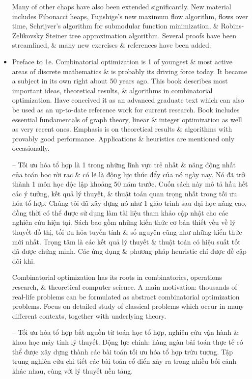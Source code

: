\documentclass{article}
\begin{document}
\begin{itemize}
    Many of other chaps have also been extended significantly. New material includes Fibonacci heaps, Fujishige's new maximum flow algorithm, flows over time, Schrijver's algorithm for submodular function minimization, \& Robins-Zelikovsky Steiner tree approximation algorithm. Several proofs have been streamlined, \& many new exercises \& references have been added.
    \item {\sf Preface to 1e.} Combinatorial optimization is 1 of youngest \& most active areas of discrete mathematics \& is probably its driving force today. It became a subject in its own right about 50 years ago. This book describes most important ideas, theoretical results, \& algorithms in combinatorial optimization. Have conceived it as an advanced graduate text which can also be used as an up-to-date reference work for current research. Book includes essential fundamentals of graph theory, linear \& integer optimization as well as very recent ones. Emphasis is on theoretical results \& algorithms with provably good performance. Applications \& heuristics are mentioned only occasionally.

    -- Tối ưu hóa tổ hợp là 1 trong những lĩnh vực trẻ nhất \& năng động nhất của toán học rời rạc \& có lẽ là động lực thúc đẩy của nó ngày nay. Nó đã trở thành 1 môn học độc lập khoảng 50 năm trước. Cuốn sách này mô tả hầu hết các ý tưởng, kết quả lý thuyết, \& thuật toán quan trọng nhất trong tối ưu hóa tổ hợp. Chúng tôi đã xây dựng nó như 1 giáo trình sau đại học nâng cao, đồng thời có thể được sử dụng làm tài liệu tham khảo cập nhật cho các nghiên cứu hiện tại. Sách bao gồm những kiến thức cơ bản thiết yếu về lý thuyết đồ thị, tối ưu hóa tuyến tính \& số nguyên cũng như những kiến thức mới nhất. Trọng tâm là các kết quả lý thuyết \& thuật toán có hiệu suất tốt đã được chứng minh. Các ứng dụng \& phương pháp heuristic chỉ được đề cập đôi khi.

    Combinatorial optimization has its roots in combinatorics, operations research, \& theoretical computer science. A main motivation: thousands of real-life problems can be formulated as abstract combinatorial optimization problems. Focus on detailed study of classical problems which occur in many different contexts, together with underlying theory.

    -- Tối ưu hóa tổ hợp bắt nguồn từ toán học tổ hợp, nghiên cứu vận hành \& khoa học máy tính lý thuyết. Động lực chính: hàng ngàn bài toán thực tế có thể được xây dựng thành các bài toán tối ưu hóa tổ hợp trừu tượng. Tập trung nghiên cứu chi tiết các bài toán cổ điển xảy ra trong nhiều bối cảnh khác nhau, cùng với lý thuyết nền tảng.


\end{itemize}
\end{document}
